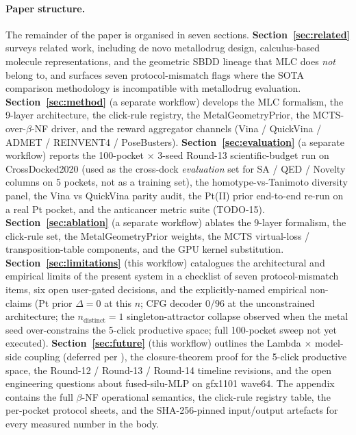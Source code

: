 \paragraph{Paper structure.}
The remainder of the paper is organised in seven sections.
\textbf{Section~\ref{sec:related}} surveys related work, including
de novo metallodrug design, calculus-based molecule representations,
and the geometric SBDD lineage that MLC does \emph{not} belong to,
and surfaces seven protocol-mismatch flags where the SOTA comparison
methodology is incompatible with metallodrug evaluation.
\textbf{Section~\ref{sec:method}} (a separate workflow) develops the
MLC formalism, the 9-layer architecture, the click-rule registry,
the MetalGeometryPrior, the MCTS-over-$\beta$-NF driver, and the
reward aggregator channels (Vina / QuickVina / ADMET / REINVENT4 /
PoseBusters).
\textbf{Section~\ref{sec:evaluation}} (a separate workflow) reports
the 100-pocket $\times$ 3-seed Round-13 scientific-budget run on
CrossDocked2020 (used as the cross-dock \emph{evaluation} set for
SA / QED / Novelty columns on 5 pockets, not as a training set), the
homotype-vs-Tanimoto diversity panel, the Vina
vs QuickVina parity audit, the Pt(II) prior end-to-end re-run on a
real Pt pocket, and the anticancer metric suite (TODO-15).
\textbf{Section~\ref{sec:ablation}} (a separate workflow) ablates
the 9-layer formalism, the click-rule set, the MetalGeometryPrior
weights, the MCTS virtual-loss / transposition-table components, and
the GPU kernel substitution.
\textbf{Section~\ref{sec:limitations}} (this workflow) catalogues
the architectural and empirical limits of the present system in a
checklist of seven protocol-mismatch items, six open
user-gated decisions, and the explicitly-named empirical
non-claims (Pt prior $\Delta = 0$ at this $n$; CFG decoder $0/96$ at
the unconstrained architecture; the $n_{\text{distinct}}{=}1$
singleton-attractor collapse observed when the metal seed
over-constrains the 5-click productive space; full 100-pocket
sweep not yet executed).
\textbf{Section~\ref{sec:future}} (this workflow) outlines the
Lambda $\times$ model-side coupling (deferred per
\cite{footnote:lambda_coupling}), the closure-theorem proof for the
5-click productive space, the Round-12 / Round-13 / Round-14
timeline revisions, and the open engineering questions about
fused-silu-MLP on gfx1101 wave64.
The appendix contains the full $\beta$-NF operational semantics,
the click-rule registry table, the per-pocket protocol sheets, and
the SHA-256-pinned input/output artefacts for every measured
number in the body.

